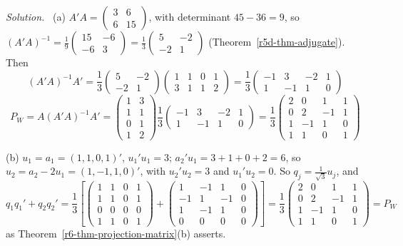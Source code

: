 \documentclass[12pt]{article}
\theoremstyle{definition}
\newenvironment{solution}{\par\noindent\textit{Solution.}\ }{\par\smallskip}
\begin{document}
\begin{solution}
(a) \(A'A=\left(\begin{smallmatrix}3&6\\6&15\end{smallmatrix}\right)\), with determinant \(45-36=9\), so
\((A'A)^{-1}=\frac19\left(\begin{smallmatrix}15&-6\\-6&3\end{smallmatrix}\right)
=\frac13\left(\begin{smallmatrix}5&-2\\-2&1\end{smallmatrix}\right)\) (Theorem~\ref{r5d-thm-adjugate}). Then
\[
(A'A)^{-1}A'=\frac13\begin{pmatrix}5&-2\\-2&1\end{pmatrix}\begin{pmatrix}1&1&0&1\\3&1&1&2\end{pmatrix}
=\frac13\begin{pmatrix}-1&3&-2&1\\1&-1&1&0\end{pmatrix}
\]
\[
P_W=A(A'A)^{-1}A'=\begin{pmatrix}1&3\\1&1\\0&1\\1&2\end{pmatrix}\frac13\begin{pmatrix}-1&3&-2&1\\1&-1&1&0\end{pmatrix}
=\frac13\begin{pmatrix}2&0&1&1\\0&2&-1&1\\1&-1&1&0\\1&1&0&1\end{pmatrix}
\]

(b) \(u_1=a_1=(1,1,0,1)'\), \(u_1'u_1=3\); \(a_2'u_1=3+1+0+2=6\), so \(u_2=a_2-2u_1=(1,-1,1,0)'\), with
\(u_2'u_2=3\) and \(u_1'u_2=0\). So \(q_j=\frac1{\sqrt3}u_j\), and
\[
q_1q_1'+q_2q_2'=\frac13\left[\begin{pmatrix}1&1&0&1\\1&1&0&1\\0&0&0&0\\1&1&0&1\end{pmatrix}
+\begin{pmatrix}1&-1&1&0\\-1&1&-1&0\\1&-1&1&0\\0&0&0&0\end{pmatrix}\right]
=\frac13\begin{pmatrix}2&0&1&1\\0&2&-1&1\\1&-1&1&0\\1&1&0&1\end{pmatrix}=P_W
\]
as Theorem~\ref{r6-thm-projection-matrix}(b) asserts.


\end{solution}
\end{document}
